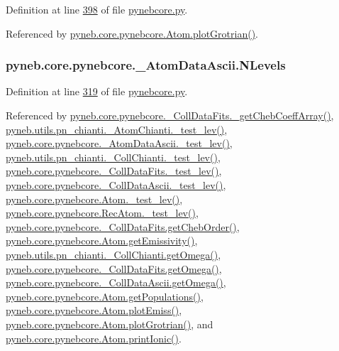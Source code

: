 Definition at line \hyperlink{pynebcore_8py_source_l00398}{398} of file \hyperlink{pynebcore_8py_source}{pynebcore.\-py}.



Referenced by \hyperlink{pynebcore_8py_source_l02443}{pyneb.\-core.\-pynebcore.\-Atom.\-plot\-Grotrian()}.

\hypertarget{classpyneb_1_1core_1_1pynebcore_1_1___atom_data_ascii_a1203cca412f63428b8ff106d608b8d83}{
\subsubsection[{N\-Levels}]{\setlength{\rightskip}{0pt plus 5cm}pyneb.\-core.\-pynebcore.\-\_\-\-Atom\-Data\-Ascii.\-N\-Levels}}\label{classpyneb_1_1core_1_1pynebcore_1_1___atom_data_ascii_a1203cca412f63428b8ff106d608b8d83}


Definition at line \hyperlink{pynebcore_8py_source_l00319}{319} of file \hyperlink{pynebcore_8py_source}{pynebcore.\-py}.



Referenced by \hyperlink{pynebcore_8py_source_l00751}{pyneb.\-core.\-pynebcore.\-\_\-\-Coll\-Data\-Fits.\-\_\-get\-Cheb\-Coeff\-Array()}, \hyperlink{pn__chianti_8py_source_l00304}{pyneb.\-utils.\-pn\-\_\-chianti.\-\_\-\-Atom\-Chianti.\-\_\-test\-\_\-lev()}, \hyperlink{pynebcore_8py_source_l00447}{pyneb.\-core.\-pynebcore.\-\_\-\-Atom\-Data\-Ascii.\-\_\-test\-\_\-lev()}, \hyperlink{pn__chianti_8py_source_l00472}{pyneb.\-utils.\-pn\-\_\-chianti.\-\_\-\-Coll\-Chianti.\-\_\-test\-\_\-lev()}, \hyperlink{pynebcore_8py_source_l00677}{pyneb.\-core.\-pynebcore.\-\_\-\-Coll\-Data\-Fits.\-\_\-test\-\_\-lev()}, \hyperlink{pynebcore_8py_source_l01045}{pyneb.\-core.\-pynebcore.\-\_\-\-Coll\-Data\-Ascii.\-\_\-test\-\_\-lev()}, \hyperlink{pynebcore_8py_source_l01525}{pyneb.\-core.\-pynebcore.\-Atom.\-\_\-test\-\_\-lev()}, \hyperlink{pynebcore_8py_source_l02672}{pyneb.\-core.\-pynebcore.\-Rec\-Atom.\-\_\-test\-\_\-lev()}, \hyperlink{pynebcore_8py_source_l00711}{pyneb.\-core.\-pynebcore.\-\_\-\-Coll\-Data\-Fits.\-get\-Cheb\-Order()}, \hyperlink{pynebcore_8py_source_l01782}{pyneb.\-core.\-pynebcore.\-Atom.\-get\-Emissivity()}, \hyperlink{pn__chianti_8py_source_l00507}{pyneb.\-utils.\-pn\-\_\-chianti.\-\_\-\-Coll\-Chianti.\-get\-Omega()}, \hyperlink{pynebcore_8py_source_l00828}{pyneb.\-core.\-pynebcore.\-\_\-\-Coll\-Data\-Fits.\-get\-Omega()}, \hyperlink{pynebcore_8py_source_l01082}{pyneb.\-core.\-pynebcore.\-\_\-\-Coll\-Data\-Ascii.\-get\-Omega()}, \hyperlink{pynebcore_8py_source_l01562}{pyneb.\-core.\-pynebcore.\-Atom.\-get\-Populations()}, \hyperlink{pynebcore_8py_source_l02384}{pyneb.\-core.\-pynebcore.\-Atom.\-plot\-Emiss()}, \hyperlink{pynebcore_8py_source_l02443}{pyneb.\-core.\-pynebcore.\-Atom.\-plot\-Grotrian()}, and \hyperlink{pynebcore_8py_source_l02233}{pyneb.\-core.\-pynebcore.\-Atom.\-print\-Ionic()}.

